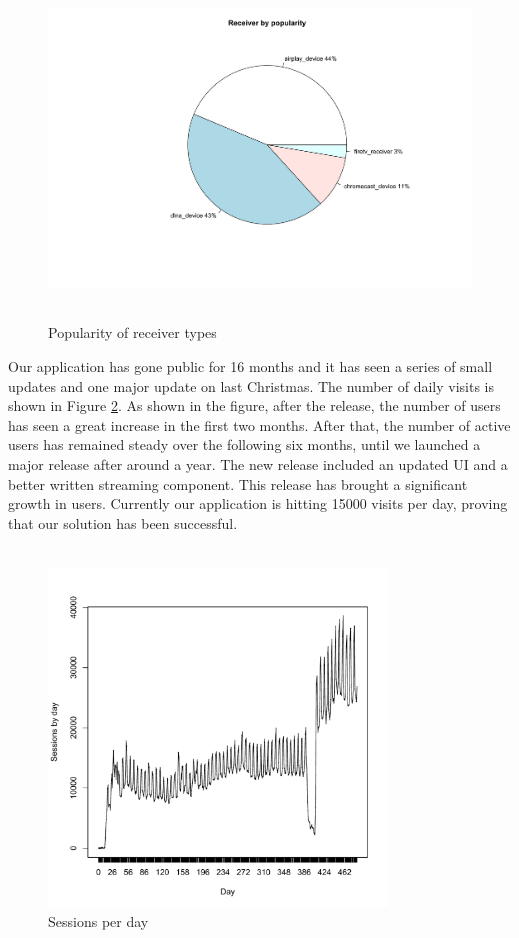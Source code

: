 \\
\begin{figure}[htb]
\centering \includegraphics[height=9cm]{charts/receiver_popularity}
\caption{Popularity of receiver types \label{receiver_types}}
\end{figure}
Our application has gone public for 16 months and it has seen a series of small updates and one major update on last Christmas. The number of daily visits is shown in Figure \ref{sessions_perday}. As shown in the figure, after the release, the number of users has seen a great increase in the first two months. After that, the number of active users has remained steady over the following six months, until we launched a major release after around a year. The new release included an updated UI and a better written streaming component. This release has brought a significant growth in users. Currently our application is hitting 15000 visits per day,  proving that our solution has been successful.\\
\\
\begin{figure}[htb]
\centering \includegraphics[height=9cm]{charts/sessions_per_day}
\caption{Sessions per day \label{sessions_perday}}
\end{figure}

